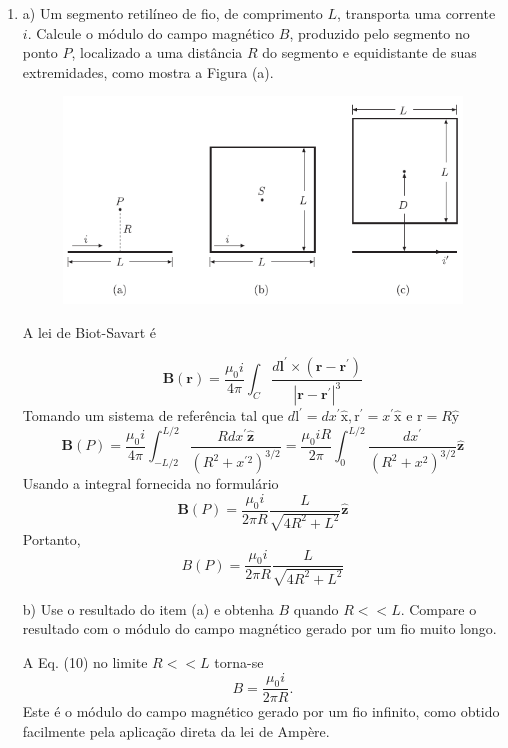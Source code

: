 \begin{enumerate}[start=1,label={\bfseries Q\arabic*.}]
\item a) Um segmento retilíneo de fio, de comprimento $L$, transporta uma corrente $i$. Calcule o módulo do campo magnético $B$, produzido pelo segmento no ponto $P$, localizado a uma distância $R$ do segmento e equidistante de suas extremidades, como mostra a Figura (a).
\begin{figure}[H]
\centering
\includegraphics[scale=1]{eletromag-img/aros.png}
\end{figure}

\resposta A lei de Biot-Savart é

$$
\mathbf{B}(\mathbf{r})=\frac{\mu_{0} i}{4 \pi} \int_{C} \frac{d \mathbf{l}^{\prime} \times\left(\mathbf{r}-\mathbf{r}^{\prime}\right)}{\left|\mathbf{r}-\mathbf{r}^{\prime}\right|^{3}}
$$
Tomando um sistema de referência tal que $d \mathrm{l}^{\prime}=d x^{\prime} \hat{\mathrm{x}}, \mathrm{r}^{\prime}=x^{\prime} \hat{\mathrm{x}}$ e $\mathrm{r}=R \hat{\mathrm{y}}$
$$
\mathbf{B}(P)=\frac{\mu_{0} i}{4 \pi} \int_{-L / 2}^{L / 2} \frac{R d x^{\prime} \hat{\mathbf{z}}}{\left(R^{2}+x^{\prime 2}\right)^{3 / 2}}=\frac{\mu_{0} i R}{2 \pi} \int_{0}^{L / 2} \frac{d x^{\prime}}{\left(R^{2}+x^{2}\right)^{3 / 2}} \hat{\mathbf{z}}
$$
Usando a integral fornecida no formulário
$$
\mathbf{B}(P)=\frac{\mu_{0} i}{2 \pi R} \frac{L}{\sqrt{4 R^{2}+L^{2}}} \hat{\mathbf{z}}
$$
Portanto,
$$
B(P)=\frac{\mu_{0} i}{2 \pi R} \frac{L}{\sqrt{4 R^{2}+L^{2}}}
$$



b) Use o resultado do item (a) e obtenha $B$ quando $R << L$. Compare o resultado com o módulo do campo magnético gerado por um fio muito longo.

\resposta A Eq. (10) no limite $R << L$ torna-se
$$
B = \frac{\mu_{0} i}{2 \pi R}.
$$
Este é o módulo do campo magnético gerado por um fio infinito, como obtido facilmente pela aplicação direta da lei de Ampère.



\end{enumerate}
